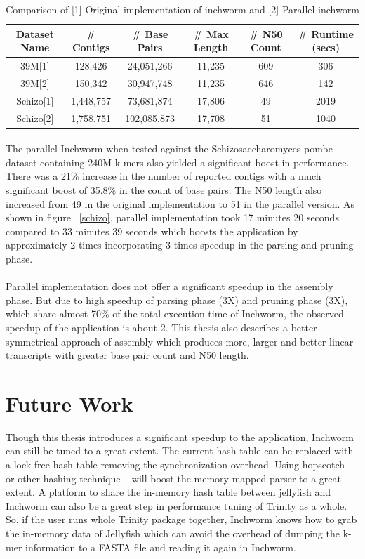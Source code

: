 \label{key}\documentclass[bachinf, english ,zihtitle,final,hyperref,utf8]{zihpub}
\begin{document}
\begin{table}
\begin{center}
\begin{tabular}{| c | c | c | c | c | c |}        
\hline            
Dataset Name & \# Contigs & \# Base Pairs & \# Max Length & \# N50 Count & \# Runtime (secs) \\	\hline
39M[1] & 128,426 & 24,051,266 & 11,235 & 609 & 306 \\ \hline
39M[2] & 150,342 & 30,947,748 & 11,235 & 646 & 142 \\ \hline
Schizo[1] & 1,448,757 & 73,681,874 & 17,806 & 49 & 2019 \\ \hline
Schizo[2] & 1,758,751 & 102,085,873 & 17,708 & 51 & 1040 \\
\hline  
\end{tabular}
\end{center}
\caption{Comparison of [1] Original implementation of inchworm and [2] Parallel inchworm}
\end{table}
\paragraph{}
The parallel Inchworm when tested against the Schizosaccharomyces pombe dataset containing 240M k-mers also yielded a significant boost in performance. There was a  21\% increase in the number of reported contigs  with a much significant boost of 35.8\% in the count of base pairs. The N50 length also increased from 49 in the original implementation to 51 in the parallel version. As shown in figure ~\ref{schizo}, parallel implementation took 17 minutes 20 seconds compared to 33 minutes 39 seconds which boosts the application by approximately 2 times incorporating 3 times speedup in the parsing and pruning phase.
\paragraph{}
Parallel implementation does not offer a significant speedup in the assembly phase. But due to high speedup of parsing phase (3X) and pruning phase (3X), which share almost 70\% of the total execution time of Inchworm, the observed speedup of the application is about 2. This thesis also describes a better symmetrical approach of assembly which produces more, larger and better linear transcripts with greater base pair count and N50 length.

\section{Future Work}
Though this thesis introduces a significant speedup to the application, Inchworm can still be tuned to a great extent. The current hash table can be replaced with a lock-free hash table removing the synchronization overhead. Using hopscotch ~\cite{hopscotch} or other hashing technique ~\cite{tock} will boost the memory mapped parser to a great extent. A platform to share the in-memory hash table between jellyfish and Inchworm can also be a great step in performance tuning of Trinity as a whole. So, if the user runs whole Trinity package together, Inchworm knows how to grab the in-memory data of Jellyfish which can avoid the overhead of dumping the k-mer information to a FASTA file and reading it again in Inchworm. 
\end{document}
